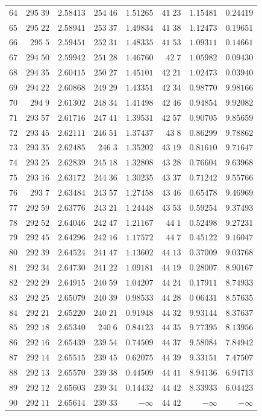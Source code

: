 \begin{center}
\begin{tabular}{r|r|r|r|r|r|r|r}
$64$&$295\;39$&$2.58413$&$254\;46$&$1.51265$&$41\;23$&$1.15481$&$0.24419$\\[2pt]
$65$&$295\;22$&$2.58941$&$253\;37$&$1.49834$&$41\;38$&$1.12473$&$0.19651$\\
$66$&$295\;5$&$2.59451$&$252\;31$&$1.48335$&$41\;53$&$1.09311$&$0.14661$\\
$67$&$294\;50$&$2.59942$&$251\;28$&$1.46760$&$42\;7$&$1.05982$&$0.09430$\\
$68$&$294\;35$&$2.60415$&$250\;27$&$1.45101$&$42\;21$&$1.02473$&$0.03940$\\
$69$&$294\;22$&$2.60868$&$249\;29$&$1.43351$&$42\;34$&$0.98770$&$9.98166$\\[2pt]
$70$&$294\;9$&$2.61302$&$248\;34$&$1.41498$&$42\;46$&$0.94854$&$9.92082$\\
$71$&$293\;57$&$2.61716$&$247\;41$&$1.39531$&$42\;57$&$0.90705$&$9.85659$\\
$72$&$293\;45$&$2.62111$&$246\;51$&$1.37437$&$43\;8$&$0.86299$&$9.78862$\\
$73$&$293\;35$&$2.62485$&$246\;3$&$1.35202$&$43\;19$&$0.81610$&$9.71647$\\
$74$&$293\;25$&$2.62839$&$245\;18$&$1.32808$&$43\;28$&$0.76604$&$9.63968$\\[2pt]
$75$&$293\;16$&$2.63172$&$244\;36$&$1.30235$&$43\;37$&$0.71242$&$9.55766$\\
$76$&$293\;7$&$2.63484$&$243\;57$&$1.27458$&$43\;46$&$0.65478$&$9.46969$\\
$77$&$292\;59$&$2.63776$&$243\;21$&$1.24448$&$43\;53$&$0.59254$&$9.37493$\\
$78$&$292\;52$&$2.64046$&$242\;47$&$1.21167$&$44\;1$&$0.52498$&$9.27231$\\
$79$&$292\;45$&$2.64296$&$242\;16$&$1.17572$&$44\;7$&$0.45122$&$9.16047$\\[2pt]
$80$&$292\;39$&$2.64524$&$241\;47$&$1.13602$&$44\;13$&$0.37009$&$9.03768$\\
$81$&$292\;34$&$2.64730$&$241\;22$&$1.09181$&$44\;19$&$0.28007$&$8.90167$\\
$82$&$292\;29$&$2.64915$&$240\;59$&$1.04207$&$44\;24$&$0.17911$&$8.74933$\\
$83$&$292\;25$&$2.65079$&$240\;39$&$0.98533$&$44\;28$&$0\;06431$&$8.57635$\\
$84$&$292\;21$&$2.65220$&$240\;21$&$0.91948$&$44\;32$&$9.93144$&$8.37637$\\[2pt]
$85$&$292\;18$&$2.65340$&$240\;6$&$0.84123$&$44\;35$&$9.77395$&$8.13956$\\
$86$&$292\;16$&$2.65439$&$239\;54$&$0.74509$&$44\;37$&$9.58084$&$7.84942$\\
$87$&$292\;14$&$2.65515$&$239\;45$&$0.62075$&$44\;39$&$9.33151$&$7.47507$\\
$88$&$292\;13$&$2.65570$&$239\;38$&$0.44509$&$44\;41$&$8.94136$&$6.94713$\\
$89$&$292\;12$&$2.65603$&$239\;34$&$0.14432$&$44\;42$&$8.33933$&$6.04423$\\[2pt]
$90$&$292\;11$&$2.65614$&$239\;33$&$-\infty$&$44\;42$&$-\infty$&$-\infty$\\
\hline
\end{tabular}
\end{center}
